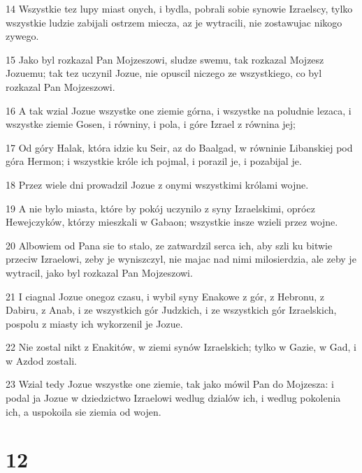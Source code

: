 \par 14 Wszystkie tez lupy miast onych, i bydla, pobrali sobie synowie Izraelscy, tylko wszystkie ludzie zabijali ostrzem miecza, az je wytracili, nie zostawujac nikogo zywego.
\par 15 Jako byl rozkazal Pan Mojzeszowi, sludze swemu, tak rozkazal Mojzesz Jozuemu; tak tez uczynil Jozue, nie opuscil niczego ze wszystkiego, co byl rozkazal Pan Mojzeszowi.
\par 16 A tak wzial Jozue wszystke one ziemie górna, i wszystke na poludnie lezaca, i wszystke ziemie Gosen, i równiny, i pola, i góre Izrael z równina jej;
\par 17 Od góry Halak, która idzie ku Seir, az do Baalgad, w równinie Libanskiej pod góra Hermon; i wszystkie króle ich pojmal, i porazil je, i pozabijal je.
\par 18 Przez wiele dni prowadzil Jozue z onymi wszystkimi królami wojne.
\par 19 A nie bylo miasta, które by pokój uczynilo z syny Izraelskimi, oprócz Hewejczyków, którzy mieszkali w Gabaon; wszystkie insze wzieli przez wojne.
\par 20 Albowiem od Pana sie to stalo, ze zatwardzil serca ich, aby szli ku bitwie przeciw Izraelowi, zeby je wyniszczyl, nie majac nad nimi milosierdzia, ale zeby je wytracil, jako byl rozkazal Pan Mojzeszowi.
\par 21 I ciagnal Jozue onegoz czasu, i wybil syny Enakowe z gór, z Hebronu, z Dabiru, z Anab, i ze wszystkich gór Judzkich, i ze wszystkich gór Izraelskich, pospolu z miasty ich wykorzenil je Jozue.
\par 22 Nie zostal nikt z Enakitów, w ziemi synów Izraelskich; tylko w Gazie, w Gad, i w Azdod zostali.
\par 23 Wzial tedy Jozue wszystke one ziemie, tak jako mówil Pan do Mojzesza: i podal ja Jozue w dziedzictwo Izraelowi wedlug dzialów ich, i wedlug pokolenia ich, a uspokoila sie ziemia od wojen.

\chapter{12}


